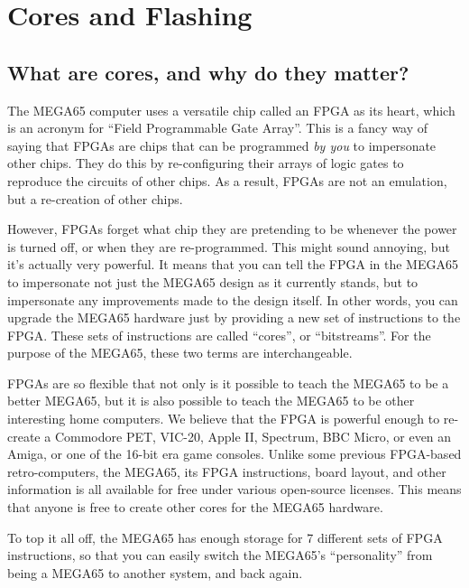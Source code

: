 \chapter{Cores and Flashing}
\label{cha:cores}

\section{What are cores, and why do they matter?}

The MEGA65 computer uses a versatile chip called an FPGA as its heart, which is
an acronym for ``Field Programmable Gate Array''. This is a fancy way of
saying that FPGAs are chips that can be programmed {\it by you} to impersonate
other chips. They do this by re-configuring their arrays of logic gates to
reproduce the circuits of other chips. As a result, FPGAs are not an emulation,
but a re-creation of other chips.

However, FPGAs forget what chip they are pretending
to be whenever the power is turned off, or when they are re-programmed.
This might sound annoying, but it's actually very powerful. It means that
you can tell the FPGA in the MEGA65 to impersonate not just the MEGA65 design
as it currently stands, but to impersonate any improvements made to the design itself.
In other words, you can upgrade the MEGA65 hardware just by providing a new
set of instructions to the FPGA.  These sets of instructions are called ``cores'',
or ``bitstreams''. For the purpose of the MEGA65, these two terms are interchangeable.

FPGAs are so flexible that not only is it possible to teach the MEGA65 to be a better
MEGA65, but it is also possible to teach the MEGA65 to be other interesting
home computers. We believe that the FPGA is powerful enough to re-create
a Commodore PET\texttrademark, VIC-20\texttrademark, Apple II\texttrademark, Spectrum\texttrademark,
BBC Micro\texttrademark, or even an Amiga\texttrademark, or one of the 16-bit era game consoles. Unlike some
previous FPGA-based retro-computers, the MEGA65, its FPGA instructions, board layout, and other information is
all available for free under various open-source licenses. This means that anyone is free to
create other cores for the MEGA65 hardware.

To top it all off, the MEGA65 has enough storage for 7 different sets of FPGA instructions,
so that you can easily switch the MEGA65's ``personality'' from being a MEGA65 to another
system, and back again.

